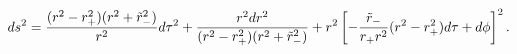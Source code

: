 \begin{equation} \label{erbtzb}
ds^2 = {(r^2- r_+^2)(r^2+ \tilde r_-^2) \over r^2} d\tau^2 + {r^2 dr^2
  \over (r^2 - r_+^2)(r^2 + \tilde r_-^2)} + r^2 \left[ -{\tilde r_-
  \over r_+ r^2} (r^2 - r_+^2) d\tau + d \phi \right]^2.
\end{equation}


